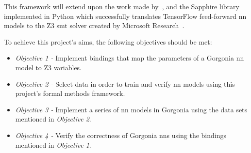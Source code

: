 This framework will extend upon the work made by~\citep{kokke2020}, and the Sapphire library implemented in Python
which successfully translates TensorFlow feed-forward \gls{nn} models to the Z3 \Gls{smt} solver created by Microsoft Research~\citep{demoura2008}.



To achieve this project's aims, the following objectives should be met:

\begin{itemize}
    \setlength\itemsep{0em}
    \item \textit{Objective 1 -} Implement bindings that map the parameters of a Gorgonia \gls{nn} model to
        Z3 variables.
    \item \textit{Objective 2 -} Select data in order to train and verify \gls{nn} models using this project's formal methods framework.
    \item \textit{Objective 3 -} Implement a series of \gls{nn} models in Gorgonia using the data sets mentioned in \textit{Objective 2}.
    \item \textit{Objective 4 -} Verify the correctness of Gorgonia \glspl{nn} using the bindings mentioned in \textit{Objective 1}.
\end{itemize}
